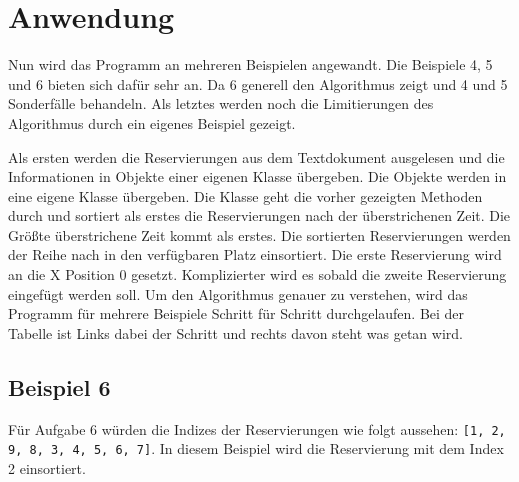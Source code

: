 \chapter{Anwendung}
Nun wird das Programm an mehreren Beispielen angewandt. Die Beispiele 4, 5 und 6 bieten sich dafür sehr an. Da 6 generell den Algorithmus zeigt und 4 und 5 Sonderfälle behandeln. Als letztes werden noch die Limitierungen des Algorithmus durch ein eigenes Beispiel gezeigt. \par
Als ersten werden die Reservierungen aus dem Textdokument ausgelesen und die Informationen in Objekte einer eigenen Klasse übergeben. Die Objekte werden in eine eigene Klasse übergeben. Die Klasse geht die vorher gezeigten Methoden durch und sortiert als erstes die Reservierungen nach der überstrichenen Zeit. Die Größte überstrichene Zeit kommt als erstes. Die sortierten Reservierungen werden der Reihe nach in den verfügbaren Platz einsortiert. Die erste Reservierung wird an die X Position 0 gesetzt. Komplizierter wird es sobald die zweite Reservierung eingefügt werden soll. Um den Algorithmus genauer zu verstehen, wird das Programm für mehrere Beispiele Schritt für Schritt durchgelaufen. Bei der Tabelle ist Links dabei der Schritt und rechts davon steht was getan wird.

\section{Beispiel 6}
Für Aufgabe 6 würden die Indizes der Reservierungen wie folgt aussehen: \texttt{[1, 2, 9, 8, 3, 4, 5, 6, 7]}. In diesem Beispiel wird die Reservierung mit dem Index 2 einsortiert.

